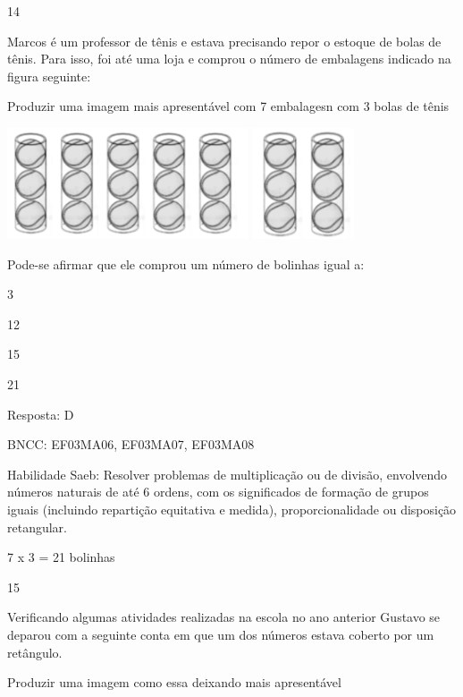 \begin{escolha}
\begin{escolha}
\num{14}

Marcos é um professor de tênis e estava precisando repor o estoque de
bolas de tênis. Para isso, foi até uma loja e comprou o número de
embalagens indicado na figura seguinte:

Produzir uma imagem mais apresentável com 7 embalagesn com 3 bolas de
tênis

\includegraphics[width=2.80882in,height=1.29243in]{media/image139.png}
\includegraphics[width=1.18628in,height=1.28713in]{media/image140.png}

Pode-se afirmar que ele comprou um número de bolinhas igual a:

\begin{escolha}

\item
  3
\item
  12
\item
  15
\item
  21
\end{escolha}

Resposta: D

BNCC: EF03MA06, EF03MA07, EF03MA08

Habilidade Saeb: Resolver problemas de multiplicação ou de divisão,
envolvendo números naturais de até 6 ordens, com os significados de
formação de grupos iguais (incluindo repartição equitativa e medida),
proporcionalidade ou disposição retangular.

7 x 3 = 21 bolinhas

\num{15}

Verificando algumas atividades realizadas na escola no ano anterior
Gustavo se deparou com a seguinte conta em que um dos números estava
coberto por um retângulo.

Produzir uma imagem como essa deixando mais apresentável


\end{escolha}
\end{escolha}
